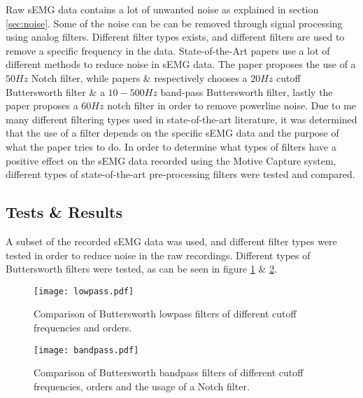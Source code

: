 \documentclass[../main.tex]{subfiles}
\begin{document}
Raw sEMG data contains a lot of unwanted noise as explained in section \ref{sec:noise}.
Some of the noise can be can be removed through signal processing using analog filters.
Different filter types exists, and different filters are used to remove a specific frequency in the data. 
State-of-the-Art papers use a lot of different methods to reduce noise in sEMG data.
The paper \cite{multdof} proposes the use of a $50Hz$ Notch filter, while papers \cite{graspintent} \& \cite{ashirbad2022} respectively chooses a $20Hz$ cutoff Buttersworth filter \& a $10-500Hz$ band-pass Buttersworth filter, lastly the paper proposes a $60Hz$ notch filter in order to remove powerline noise.
Due to me many different filtering types used in state-of-the-art literature, it was determined that the use of a filter depends on the specific sEMG data and the purpose of what the paper tries to do.
In order to determine what types of filters have a positive effect on the sEMG data recorded using the Motive Capture system, different types of state-of-the-art pre-processing filters were tested and compared.


\subsection{Tests \& Results}

A subset of the recorded sEMG data was used, and different filter types were tested in order to reduce noise in the raw recordings.
Different types of Buttersworth filters were tested, as can be seen in figure \ref{fig:lowpass} \& \ref{fig:bandpass}.

\begin{figure}[H]
\begin{center}
\texttt{[image: lowpass.pdf]}
\caption{Comparison of Buttersworth lowpass filters of different cutoff frequencies and orders.}
\label{fig:lowpass}
\end{center}
\end{figure}
\begin{figure}[H]
\begin{center}
\texttt{[image: bandpass.pdf]}
\caption{Comparison of Buttersworth bandpass filters of different cutoff frequencies, orders and the usage of a Notch filter.}
\label{fig:bandpass}
\end{center}
\end{figure}
\end{document}
